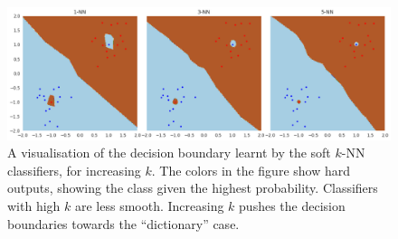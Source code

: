 \documentclass{ociamthesis}
\begin{document}
\begin{figure}[!h]
    \centering
    \includegraphics[scale=0.37]{nn-map.png}
    \caption{A visualisation of the decision boundary learnt by the soft $k$-NN
    classifiers, for increasing $k$. The colors in the figure show hard outputs,
    showing the class given the highest probability. Classifiers with high $k$
    are less smooth. Increasing $k$ pushes the decision boundaries towards the
    ``dictionary'' case.}
    \label{fig:knn-map}
\end{figure}

\begin{figure}[!h]
    \centering
    \qquad
    \qquad
    \caption{}
    \label{fig:knn-accuracies}
\end{figure}
\end{document}
